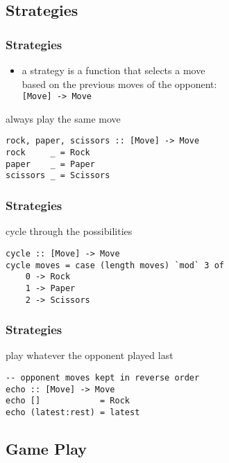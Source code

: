 \documentclass[dvipsnames]{beamer}
\theoremstyle{plain}
\begin{document}
\subsection{Strategies}

\begin{frame}[fragile]
  \frametitle{Strategies}

  \begin{itemize}
    \item a strategy is a function that selects a move\\
      based on the previous moves of the opponent:\\
      \smallskip
      \lstinline|[Move] -> Move|
  \end{itemize}

  \begin{exampleblock}{always play the same move}
    \begin{lstlisting}
rock, paper, scissors :: [Move] -> Move
rock     _ = Rock
paper    _ = Paper
scissors _ = Scissors
    \end{lstlisting}
  \end{exampleblock}
\end{frame}

\begin{frame}[fragile]
  \frametitle{Strategies}

  \begin{exampleblock}{cycle through the possibilities}
    \begin{lstlisting}[deletekeywords={cycle}]
cycle :: [Move] -> Move
cycle moves = case (length moves) `mod` 3 of
    0 -> Rock
    1 -> Paper
    2 -> Scissors
    \end{lstlisting}
  \end{exampleblock}
\end{frame}

\begin{frame}[fragile]
  \frametitle{Strategies}

  \begin{exampleblock}{play whatever the opponent played last}
    \begin{lstlisting}
-- opponent moves kept in reverse order
echo :: [Move] -> Move
echo []            = Rock
echo (latest:rest) = latest
    \end{lstlisting}
  \end{exampleblock}
\end{frame}

\subsection{Game Play}
\end{document}
